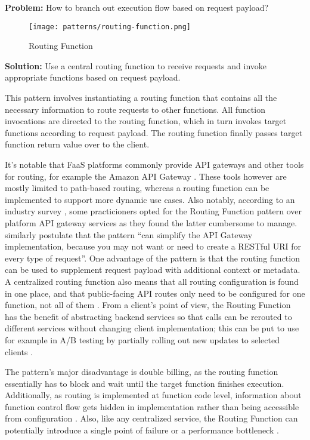 \textbf{Problem:} How to branch out execution flow based on request payload?

\begin{figure}[h]
  \centering
  \texttt{[image: patterns/routing-function.png]}
  \caption{Routing Function}
  \label{fig:patternRoutingFunction}
\end{figure}

\textbf{Solution:} Use a central routing function to receive requests and invoke appropriate functions based on request payload.

This pattern involves instantiating a routing function that contains all the necessary information to route requests to other functions. All function invocations are directed to the routing function, which in turn invokes target functions according to request payload. The routing function finally passes target function return value over to the client.

It's notable that FaaS platforms commonly provide API gateways and other tools for routing, for example the Amazon API Gateway \parencite{awslambda0218}. These tools however are mostly limited to path-based routing, whereas a routing function can be implemented to support more dynamic use cases. Also notably, according to an industry survey \parencite{leitner18industrialpractice}, some practicioners opted for the Routing Function pattern over platform API gateway services as they found the latter cumbersome to manage. \textcite{sbarski2017serverless} similarly postulate that the pattern ``can simplify the API Gateway implementation, because you may not want or need to create a RESTful URI for every type of request''. One advantage of the pattern is that the routing function can be used to supplement request payload with additional context or metadata. A centralized routing function also means that all routing configuration is found in one place, and that public-facing API routes only need to be configured for one function, not all of them \parencite{leitner18industrialpractice}. From a client's point of view, the Routing Function has the benefit of abstracting backend services so that calls can be rerouted to different services without changing client implementation; this can be put to use for example in A/B testing by partially rolling out new updates to selected clients \parencite{microsoft18cloudPatterns}.

The pattern's major disadvantage is double billing, as the routing function essentially has to block and wait until the target function finishes execution. Additionally, as routing is implemented at function code level, information about function control flow gets hidden in implementation rather than being accessible from configuration \parencite{leitner18industrialpractice}. Also, like any centralized service, the Routing Function can potentially introduce a single point of failure or a performance bottleneck \parencite{microsoft18cloudPatterns}.


